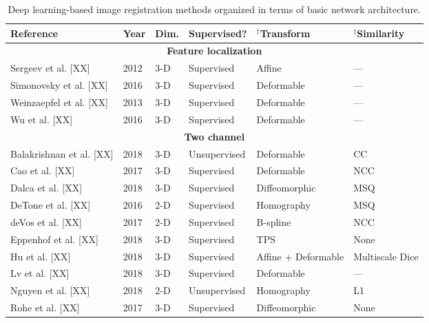 

\begin{table}[!htb]
\centering
\caption{Deep learning-based image registration methods organized in terms of basic
         network architecture.}
\label{table:methods}
\begin{tabular*}{\textwidth}{l@{\extracolsep{\fill}}l@{\extracolsep{\fill}}l@{\extracolsep{\fill}}l@{\extracolsep{\fill}}l@{\extracolsep{\fill}}l}
\toprule
\midrule
\textbf{Reference} & \textbf{Year} & \textbf{Dim.} & \textbf{Supervised?} & $^\dagger$\textbf{Transform} & $^\ddagger$\textbf{Similarity} \\
\midrule
\midrule
\multicolumn{6}{c}{\textbf{Feature localization}}
  \vspace{0.25cm} \\
  Sergeev et al. [XX] & 2012 & 3-D & Supervised & Affine & --- \\
  Simonovsky et al. [XX] & 2016 & 3-D & Supervised & Deformable & --- \\
  Weinzaepfel et al. [XX] & 2013 & 3-D & Supervised & Deformable & --- \\
  Wu et al. [XX] & 2016 & 3-D & Supervised & Deformable & --- \\
\midrule
\multicolumn{6}{c}{\textbf{Two channel}}
  \vspace{0.25cm} \\
  Balakrishnan et al. [XX] & 2018 & 3-D & Unsupervised & Deformable & CC \\
  Cao et al. [XX] & 2017 & 3-D & Supervised & Deformable & NCC \\
  Dalca et al. [XX] & 2018 & 3-D & Supervised & Diffeomorphic & MSQ \\
  DeTone et al. [XX] & 2016 & 2-D & Supervised & Homography & MSQ \\
  deVos et al. [XX] & 2017 & 2-D & Supervised & B-spline & NCC \\
  Eppenhof et al. [XX] & 2018 & 3-D & Supervised & TPS & None \\       %
  Hu et al. [XX] & 2018 & 3-D & Supervised & Affine + Deformable & Multiscale Dice \\
  Lv et al. [XX] & 2018 & 3-D & Supervised & Deformable & --- \\
  Nguyen et al. [XX] & 2018 & 2-D & Unsupervised & Homography & L1 \\
  Rohe et al. [XX] & 2017 & 3-D & Supervised & Diffeomorphic & None \\  %

\end{tabular*}
\end{table}

